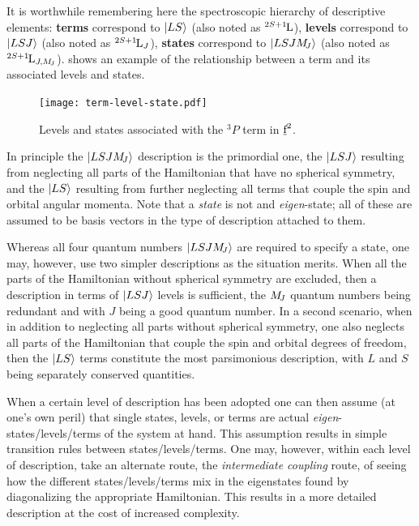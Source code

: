 \documentclass{article}
\begin{document}
It is worthwhile remembering here the spectroscopic hierarchy of descriptive elements: \textbf{terms} correspond to $|LS\rangle$ (also noted as ${}^{2S+1}{\kern-0.1em}{\text{L}}$),  \textbf{levels} correspond to $|LSJ\rangle$ (also noted as ${}^{2S+1}{\kern-0.1em}{\text{L}}_{J}$),  \textbf{states} correspond to $|LSJM_{\!{J}}\rangle$ (also noted as ${}^{2S+1}{\kern-0.1em}{\text{L}}_{J,M_{\!{J}}}$).  shows an example of the relationship between a term and its associated levels and states.

\begin{figure}
\centering
	\texttt{[image: term-level-state.pdf]}
\caption{Levels and states associated with the ${}^3\!P$ term in $\underbar{$\text{f}$}^2$.}
\label{fig: terms-level-states} 
\end{figure}


In principle the  $|LSJM_{\!{J}}\rangle$ description is the primordial one, the $|LSJ\rangle$ resulting from neglecting all parts of the Hamiltonian that have no spherical symmetry, and the $|LS\rangle$ resulting from further neglecting all terms that couple the spin and orbital angular momenta. Note that a \textit{state} is not and \textit{eigen}-state; all of these are assumed to be basis vectors in the type of description attached to them.

Whereas all four quantum numbers $|LSJM_{\!{J}}\rangle$ are required to specify a state, one may, however, use two simpler descriptions as the situation merits. When all the parts of the Hamiltonian without spherical symmetry are excluded, then a description in terms of $|LSJ\rangle$ levels is sufficient, the $M_{\!{J}}$ quantum numbers being redundant and with $J$ being a good quantum number. In a second scenario, when in addition to neglecting all parts without spherical symmetry, one also neglects all parts of the Hamiltonian that couple the spin and orbital degrees of freedom, then the $|LS\rangle$ terms constitute the most parsimonious description, with $L$ and $S$ being separately conserved quantities.

When a certain level of description has been adopted one can then assume (at one's own peril) that single states, levels, or terms are actual \textit{eigen}-states/levels/terms of the system at hand. This assumption results in simple transition rules between states/levels/terms. One may, however, within each level of description, take an alternate route, the \textit{intermediate coupling} route, of seeing how the different states/levels/terms mix in the eigenstates found by diagonalizing the appropriate Hamiltonian. This results in a more detailed description at the cost of increased complexity.
\end{document}
